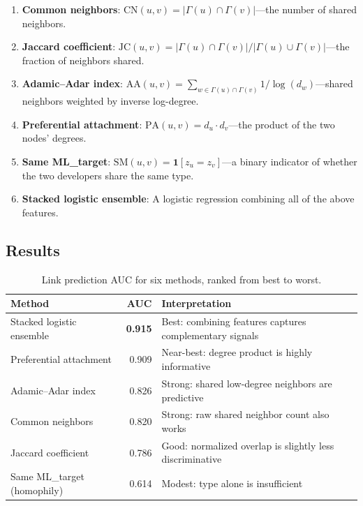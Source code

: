 \documentclass[letterpaper]{article}
\begin{document}
\begin{enumerate}
  \item \textbf{Common neighbors}: $\text{CN}(u,v) = |\Gamma(u) \cap \Gamma(v)|$---the number of shared neighbors.
  \item \textbf{Jaccard coefficient}: $\text{JC}(u,v) = |\Gamma(u) \cap \Gamma(v)| / |\Gamma(u) \cup \Gamma(v)|$---the fraction of neighbors shared.
  \item \textbf{Adamic--Adar index}: $\text{AA}(u,v) = \sum_{w \in \Gamma(u) \cap \Gamma(v)} 1/\log(d_w)$---shared neighbors weighted by inverse log-degree.
  \item \textbf{Preferential attachment}: $\text{PA}(u,v) = d_u \cdot d_v$---the product of the two nodes' degrees.
  \item \textbf{Same ML\_target}: $\text{SM}(u,v) = \mathbf{1}[z_u = z_v]$---a binary indicator of whether the two developers share the same type.
  \item \textbf{Stacked logistic ensemble}: A logistic regression combining all of the above features.
\end{enumerate}

\subsection{Results}

\begin{table}[H]
  \centering
  \begin{tabular}{lrl}
    \toprule
    \textbf{Method} & \textbf{AUC} & \textbf{Interpretation} \\
    \midrule
    Stacked logistic ensemble   & \textbf{0.915} & Best: combining features captures complementary signals \\
    Preferential attachment      & 0.909 & Near-best: degree product is highly informative \\
    Adamic--Adar index          & 0.826 & Strong: shared low-degree neighbors are predictive \\
    Common neighbors            & 0.820 & Strong: raw shared neighbor count also works \\
    Jaccard coefficient         & 0.786 & Good: normalized overlap is slightly less discriminative \\
    Same ML\_target (homophily)  & 0.614 & Modest: type alone is insufficient \\
    \bottomrule
  \end{tabular}
  \caption{Link prediction AUC for six methods, ranked from best to worst.}
  \label{tab:link_prediction}
\end{table}
\end{document}
